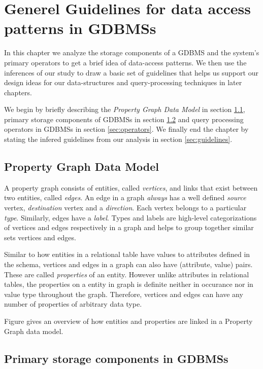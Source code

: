 \chapter{Generel Guidelines for data access patterns in GDBMSs}
\label{guidelines}

In this chapter we analyze the storage components of a GDBMS and the system's primary operators to get a brief idea of data-access patterns. We then use the inferences of our study to draw a basic set of guidelines that helps us support our design ideas for our data-structures and query-processing techniques in later chapters.

We begin by briefly describing the \emph{Property Graph Data Model} in section \ref{sec:property-graph-data-model}, primary storage components of GDBMSs in section \ref{sec:storage-components} and query processing operators in GDBMSs in section \ref{sec:operators}. We finally end the chapter by stating the infered guidelines from our analysis in section \ref{sec:guidelines}.

\section{Property Graph Data Model}
\label{sec:property-graph-data-model}

A property graph consists of entities, called \emph{vertices}, and links that exist between two entities, called \emph{edges}. An edge in a graph \emph{always} has a well defined \emph{source} vertex, \emph{destination} vertex and a \emph{direction}. Each vertex belongs to a particular \emph{type}. Similarly, edges have a \emph{label}. Types and labels are high-level categorizations of vertices and edges respectively in a graph and helps to group together similar sets vertices and edges.

Similar to how entities in a relational table have values to attributes defined in the schema, vertices and edges in a graph can also have (attribute, value) pairs. These are called \emph{properties} of an entity. 
However unlike attributes in relational tables, the properties on a entity in graph is definite neither in occurance nor in value type throughout the graph. Therefore, vertices and edges can have any number of properties of arbitrary data type.

Figure \cite{property} gives an overview of how entities and properties are linked in a Property Graph data model.

\section{Primary storage components in GDBMSs}
\label{sec:storage-components}

